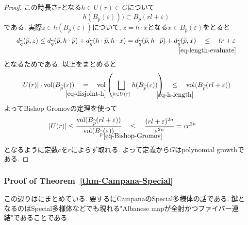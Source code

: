 \documentclass[dvipdfmx,a4paper,11pt]{article} %
\theoremstyle{definition}
\theoremstyle{remark}
\numberwithin{equation}{section}
\newcommand{\underalign}[2]{%
  \quad
  \underset{\mathclap{\raisebox{-1.6ex}{\ensuremath{\scriptstyle #1}}}}{#2}
  \quad
}
\begin{document}
\begin{proof}
この時長さ$r$となる$h \in U(r) \subset G$について
\begin{equation}
\label{eq-h-length}
h(B_{\widetilde p}(\varepsilon))) \subset B_{\widetilde p}(rl+\varepsilon)
\end{equation}
である. 実際$z \in h(B_{\widetilde p}(\varepsilon))
$について, 
$z=h \cdot x$となる$x \in B_{\widetilde p}(\varepsilon)$をとると
\[
d_{\widetilde{g}}(\widetilde{p}, z) 
\leq 
d_{\widetilde{g}}(\widetilde{p}, h\cdot \widetilde{p}) 
+ d_{\widetilde{g}}(h\cdot \widetilde{p}, h \cdot x) 
=
d_{\widetilde{g}}(\widetilde{p}, h\cdot \widetilde{p}) 
+ d_{\widetilde{g}}(\widetilde{p}, x) 
\underalign{\eqref{eq-length-evaluate}}{\leq}  lr + \varepsilon
\]
となるためである. 以上をまとめると
\[
\begin{aligned}
\lvert U(r)\rvert\cdot\operatorname{vol}(B_{\widetilde p}(\varepsilon))
\underalign{\eqref{eq-disjoint-h}}{=}
\operatorname{vol}
\left(
\bigsqcup_{h\in U(r)}
h(B_{\widetilde p}(\varepsilon))
\right)
\underalign{\eqref{eq-h-length}}{\leq}
\operatorname{vol}(B_{\widetilde p}(rl+\varepsilon))
\end{aligned}
\]
よってBishop Gromovの定理を使って
\[
\begin{aligned}
\lvert U(r)\rvert
&\leq
\frac{\operatorname{vol}(B_{\widetilde p}(rl+\varepsilon))}
{\operatorname{vol}(B_{\widetilde p}(\varepsilon))}
\underalign{\eqref{eq-Bishop-Gromov}}{\leq}
\frac{(rl+\varepsilon)^{2n}}{\varepsilon^{2n}}
=
cr^{2n}
\end{aligned}
\]
となるように定数$c$を$r$によらず取れる. 
よって定義から$G$はpolynomial growthである. 
\end{proof}


\subsubsection{Proof of Theorem~\ref{thm-Campana-Special}}
この辺りは\cite[Section 7]{Iwa-Cam}にまとめている. 
要するにCampanaのSpecial多様体の話である. 
鍵となるのはSpecial多様体などでも現れる"Albanese mapが全射かつファイバー連結"であることである. 
\end{document}
